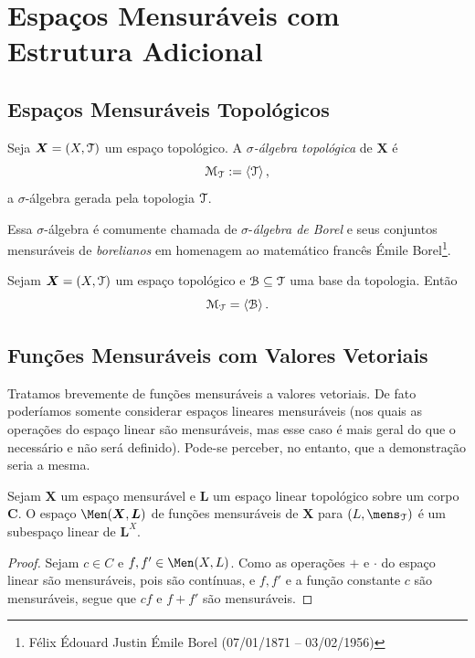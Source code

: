 \clearpage
\section{Espaços Mensuráveis com Estrutura Adicional}

\subsection{Espaços Mensuráveis Topológicos}

\begin{defi}
Seja $\bm X=(X,\mathcal{T})$ um espaço topológico. A \emph{$\sigma$-álgebra topológica} de $\bm X$ é
	\begin{equation*}
	\mathcal{M}_{\mathcal{T}} := \left\langle \mathcal{T} \right\rangle,
	\end{equation*}
a $\sigma$-álgebra gerada pela topologia $\mathcal{T}$.
\end{defi}

Essa $\sigma$-álgebra é comumente chamada de $\sigma$-\emph{álgebra de Borel} e seus conjuntos mensuráveis de \emph{borelianos} em homenagem ao matemático francês Émile Borel\footnote{Félix Édouard Justin Émile Borel (07/01/1871 – 03/02/1956)}.

\begin{prop}
Sejam $\bm X=(X,\mathcal{T})$ um espaço topológico e $\mathcal{B} \subseteq \mathcal{T}$ uma base da topologia. Então
	\begin{equation*}
	\mathcal{M}_{\mathcal{T}} = \left\langle \mathcal B \right\rangle.
	\end{equation*}
\end{prop}


\subsection{Funções Mensuráveis com Valores Vetoriais}

Tratamos brevemente de funções mensuráveis a valores vetoriais. De fato poderíamos somente considerar espaços lineares mensuráveis (nos quais as operações do espaço linear são mensuráveis, mas esse caso é mais geral do que o necessário e não será definido). Pode-se perceber, no entanto, que a demonstração seria a mesma.

\begin{prop}
Sejam $\bm X$ um espaço mensurável e $\bm L$ um espaço linear topológico sobre um corpo $\bm C$. O espaço $\Men(\bm X,\bm L)$ de funções mensuráveis de $\bm X$ para $(L,\mens_\topo)$ é um subespaço linear de ${\bm L}^X$.
\end{prop}
\begin{proof}
Sejam $c \in C$ e $f,f' \in \Men(X,L)$. Como as operações $+$ e $\cdot$ do espaço linear são mensuráveis, pois são contínuas, e $f,f'$ e a função constante $c$ são mensuráveis, segue que $cf$ e $f+f'$ são mensuráveis.
\end{proof}


